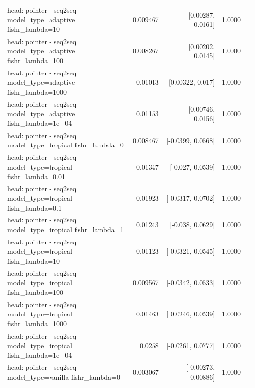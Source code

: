 \documentclass[10pt]{article}
\makeatletter
\newcommand{\stackcell}[1]{\begin{tabular}[t]{@{}l@{}}#1\end{tabular}}
\makeatother
\begin{document}
{\begin{longtable}{lrrrl}
\stackcell{head: pointer - seq2seq\\\footnotesize model\_type=adaptive fishr\_lambda=10 } & 0.009467 & [0.00287, 0.0161] & 1.0000 & \\
\stackcell{head: pointer - seq2seq\\\footnotesize model\_type=adaptive fishr\_lambda=100 } & 0.008267 & [0.00202, 0.0145] & 1.0000 & \\
\stackcell{head: pointer - seq2seq\\\footnotesize model\_type=adaptive fishr\_lambda=1000 } & 0.01013 & [0.00322, 0.017] & 1.0000 & \\
\stackcell{head: pointer - seq2seq\\\footnotesize model\_type=adaptive fishr\_lambda=1e+04 } & 0.01153 & [0.00746, 0.0156] & 1.0000 & \\
\stackcell{head: pointer - seq2seq\\\footnotesize model\_type=tropical fishr\_lambda=0 } & 0.008467 & [-0.0399, 0.0568] & 1.0000 & \\
\stackcell{head: pointer - seq2seq\\\footnotesize model\_type=tropical fishr\_lambda=0.01 } & 0.01347 & [-0.027, 0.0539] & 1.0000 & \\
\stackcell{head: pointer - seq2seq\\\footnotesize model\_type=tropical fishr\_lambda=0.1 } & 0.01923 & [-0.0317, 0.0702] & 1.0000 & \\
\stackcell{head: pointer - seq2seq\\\footnotesize model\_type=tropical fishr\_lambda=1 } & 0.01243 & [-0.038, 0.0629] & 1.0000 & \\
\stackcell{head: pointer - seq2seq\\\footnotesize model\_type=tropical fishr\_lambda=10 } & 0.01123 & [-0.0321, 0.0545] & 1.0000 & \\
\stackcell{head: pointer - seq2seq\\\footnotesize model\_type=tropical fishr\_lambda=100 } & 0.009567 & [-0.0342, 0.0533] & 1.0000 & \\
\stackcell{head: pointer - seq2seq\\\footnotesize model\_type=tropical fishr\_lambda=1000 } & 0.01463 & [-0.0246, 0.0539] & 1.0000 & \\
\stackcell{head: pointer - seq2seq\\\footnotesize model\_type=tropical fishr\_lambda=1e+04 } & 0.0258 & [-0.0261, 0.0777] & 1.0000 & \\
\stackcell{head: pointer - seq2seq\\\footnotesize model\_type=vanilla fishr\_lambda=0 } & 0.003067 & [-0.00273, 0.00886] & 1.0000 & \\

\end{longtable}}
\end{document}
